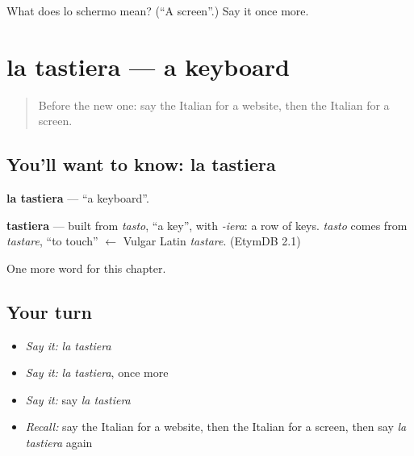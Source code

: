 \begin{tcolorbox}[breakable,colback=teal!4,colframe=teal!35!black,title={Before you move on}]
What does lo schermo mean? (\textquotedblleft{}A screen\textquotedblright{}.) Say it once more.
\end{tcolorbox}
\section[la tastiera]{la tastiera — a keyboard}

\label{lesson:IT-C162-tastiera}



\begin{quote}
Before the new one: say the Italian for a website, then the Italian for a screen.
\end{quote}

\subsection*{You'll want to know: la tastiera}
\textbf{la tastiera} — \textquotedblleft{}a keyboard\textquotedblright{}.

\begin{cousinweb}
\textbf{tastiera} — built from \emph{tasto}, \textquotedblleft{}a key\textquotedblright{}, with \emph{-iera}: a row of keys. \emph{tasto} comes from \emph{tastare}, \textquotedblleft{}to touch\textquotedblright{} $\leftarrow$ Vulgar Latin \emph{tastare}. (EtymDB 2.1)
\end{cousinweb}

\begin{grammarlens}[title={What you've built}]
One more word for this chapter.
\end{grammarlens}

\subsection*{Your turn}
\begin{itemize}
\raggedright
  \item \emph{Say it:} \emph{la tastiera}
  \item \emph{Say it:} \emph{la tastiera}, once more
  \item \emph{Say it:} say \emph{la tastiera}
  \item \emph{Recall:} say the Italian for a website, then the Italian for a screen, then say \emph{la tastiera} again
\end{itemize}

